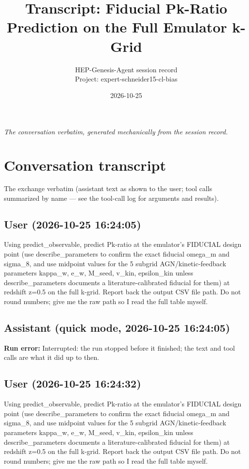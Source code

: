 \documentclass[11pt,a4paper]{article}
\title{Transcript: Fiducial Pk-Ratio Prediction on the Full Emulator k-Grid}
\author{HEP-Genesis-Agent session record \\ \small Project: expert-schneider15-cl-bias}
\date{2026-10-25}
\begin{document}
\maketitle
\noindent\textit{\small The conversation verbatim, generated mechanically from the session record.}
\vspace{1em}



\appendix
\section{Conversation transcript}
\label{app:transcript}
The exchange verbatim (assistant text as shown to the user; tool calls summarized by name --- see the tool-call log for arguments and results).
\subsection*{User \small(2026-10-25 16:24:05)}
Using predict\_observable, predict Pk-ratio at the emulator's FIDUCIAL design point (use describe\_parameters to confirm the exact fiducial omega\_m and sigma\_8, and use midpoint values for the 5 subgrid AGN/kinetic-feedback parameters kappa\_w, e\_w, M\_seed, v\_kin, epsilon\_kin unless describe\_parameters documents a literature-calibrated fiducial for them) at redshift z=0.5 on the full k-grid. Report back the output CSV file path. Do not round numbers; give me the raw path so I read the full table myself.

\subsection*{Assistant \small(quick mode, 2026-10-25 16:24:05)}
\textbf{Run error:} Interrupted: the run stopped before it finished; the text and tool calls are what it did up to then.\par
\subsection*{User \small(2026-10-25 16:24:32)}
Using predict\_observable, predict Pk-ratio at the emulator's FIDUCIAL design point (use describe\_parameters to confirm the exact fiducial omega\_m and sigma\_8, and use midpoint values for the 5 subgrid AGN/kinetic-feedback parameters kappa\_w, e\_w, M\_seed, v\_kin, epsilon\_kin unless describe\_parameters documents a literature-calibrated fiducial for them) at redshift z=0.5 on the full k-grid. Report back the output CSV file path. Do not round numbers; give me the raw path so I read the full table myself.
\end{document}
